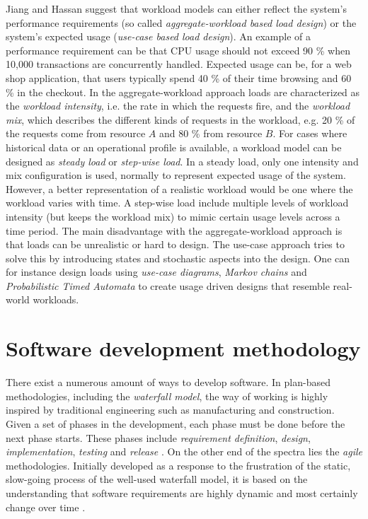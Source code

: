 Jiang and Hassan suggest that workload models can either reflect the system's
performance requirements (so called \textit{aggregate-workload based load
design}) or the system's expected usage (\textit{use-case based load design}).
An example of a performance requirement can be that CPU usage should not exceed
90 \% when 10,000 transactions are concurrently handled. Expected usage can be,
for a web shop application, that users typically spend 40 \% of their time
browsing and 60 \% in the checkout. In the aggregate-workload approach loads
are characterized as the \textit{workload intensity}, i.e. the rate in which
the requests fire, and the \textit{workload mix}, which describes the different
kinds of requests in the workload, e.g. 20 \% of the requests come from
resource $A$ and 80 \% from resource $B$. For cases where historical data or an
operational profile is available, a workload model can be designed as
\textit{steady load} or \textit{step-wise load}. In a steady load, only one
intensity and mix configuration is used, normally to represent expected usage
of the system. However, a better representation of a realistic workload would
be one where the workload varies with time. A step-wise load include multiple
levels of workload intensity (but keeps the workload mix) to mimic certain
usage levels across a time period. The main disadvantage with the
aggregate-workload approach is that loads can be unrealistic or hard to design.
The use-case approach tries to solve this by introducing states and stochastic
aspects into the design. One can for instance design loads using
\textit{use-case diagrams}, \textit{Markov chains} and \textit{Probabilistic
Timed Automata} to create usage driven designs that resemble real-world
workloads. \cite{jiang2015survey}

\section{Software development methodology}

There exist a numerous amount of ways to develop software. In plan-based
methodologies, including the \textit{waterfall model}, the way of working is
highly inspired by traditional engineering such as manufacturing and
construction. Given a set of phases in the development, each phase must be done
before the next phase starts. These phases include \textit{requirement
definition}, \textit{design}, \textit{implementation}, \textit{testing} and
\textit{release} \cite{crookshanks2014practical}. On the other end of the
spectra lies the \textit{agile} methodologies. Initially developed as a
response to the frustration of the static, slow-going process of the well-used
waterfall model, it is based on the understanding that software requirements
are highly dynamic and most certainly change over time
\cite{moniruzzaman2013comparative}.

